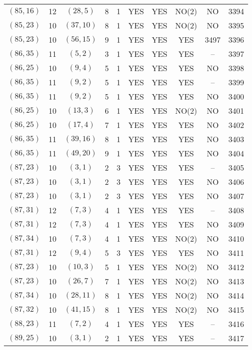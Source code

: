 \begin{longtable}{|c|c|c|c|c|c|c|c|c|c|}
$(85, 16)$ & 12 & $(28, 5)$ & 8 & 1 & YES & YES & NO(2) & NO & 3394\\
$(85, 23)$ & 10 & $(37, 10)$ & 8 & 1 & YES & YES & NO(2) & NO & 3395\\
$(85, 23)$ & 10 & $(56, 15)$ & 9 & 1 & YES & YES & YES & 3497 & 3396\\
$(86, 35)$ & 11 & $(5, 2)$ & 3 & 1 & YES & YES & YES & -- & 3397\\
$(86, 25)$ & 10 & $(9, 4)$ & 5 & 1 & YES & YES & YES & NO & 3398\\
$(86, 35)$ & 11 & $(9, 2)$ & 5 & 1 & YES & YES & YES & -- & 3399\\
$(86, 35)$ & 11 & $(9, 2)$ & 5 & 1 & YES & YES & YES & NO & 3400\\
$(86, 25)$ & 10 & $(13, 3)$ & 6 & 1 & YES & YES & NO(2) & NO & 3401\\
$(86, 25)$ & 10 & $(17, 4)$ & 7 & 1 & YES & YES & YES & NO & 3402\\
$(86, 35)$ & 11 & $(39, 16)$ & 8 & 1 & YES & YES & YES & NO & 3403\\
$(86, 35)$ & 11 & $(49, 20)$ & 9 & 1 & YES & YES & YES & NO & 3404\\
$(87, 23)$ & 10 & $(3, 1)$ & 2 & 3 & YES & YES & YES & -- & 3405\\
$(87, 23)$ & 10 & $(3, 1)$ & 2 & 3 & YES & YES & YES & NO & 3406\\
$(87, 23)$ & 10 & $(3, 1)$ & 2 & 3 & YES & YES & YES & NO & 3407\\
$(87, 31)$ & 12 & $(7, 3)$ & 4 & 1 & YES & YES & YES & -- & 3408\\
$(87, 31)$ & 12 & $(7, 3)$ & 4 & 1 & YES & YES & YES & NO & 3409\\
$(87, 34)$ & 10 & $(7, 3)$ & 4 & 1 & YES & YES & NO(2) & NO & 3410\\
$(87, 31)$ & 12 & $(9, 4)$ & 5 & 3 & YES & YES & YES & NO & 3411\\
$(87, 23)$ & 10 & $(10, 3)$ & 5 & 1 & YES & YES & NO(2) & NO & 3412\\
$(87, 23)$ & 10 & $(26, 7)$ & 7 & 1 & YES & YES & NO(2) & NO & 3413\\
$(87, 34)$ & 10 & $(28, 11)$ & 8 & 1 & YES & YES & NO(2) & NO & 3414\\
$(87, 32)$ & 10 & $(41, 15)$ & 8 & 1 & YES & YES & NO(2) & NO & 3415\\
$(88, 23)$ & 11 & $(7, 2)$ & 4 & 1 & YES & YES & YES & -- & 3416\\
$(89, 25)$ & 10 & $(3, 1)$ & 2 & 1 & YES & YES & YES & -- & 3417\\

\end{longtable}

